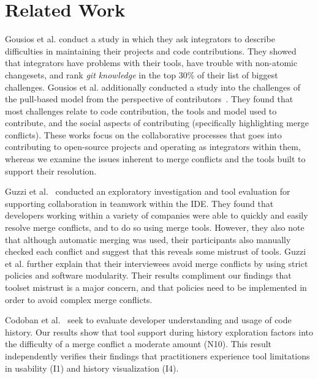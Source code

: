 \section{Related Work}\label{related_work}

Gousios et al. \cite{integrator_perspective} conduct a study in which they ask integrators to describe difficulties in maintaining their projects and code contributions. 
They showed that integrators have problems with their tools, have trouble with non-atomic changesets, and rank \textit{git knowledge} in the top 30\% of their list of biggest challenges. 
Gousios et al. additionally conducted a study into the challenges of the pull-based model from the perspective of contributors~\cite{gousios2016work}. 
They found that most challenges relate to code contribution, the tools and model used to contribute, and the social aspects of contributing (specifically highlighting merge conflicts).
These works focus on the collaborative processes that goes into contributing to open-source projects and operating as integrators within them, whereas we examine the issues inherent to merge conflicts and the tools built to support their resolution.

Guzzi et al.~\cite{Guzzi2015} conducted an exploratory investigation and tool evaluation for supporting collaboration in teamwork within the IDE.
They found that developers working within a variety of companies were able to quickly and easily resolve merge conflicts, and to do so using merge tools.
However, they also note that although automatic merging was used, their participants also manually checked each conflict and suggest that this reveals some mistrust of tools.
Guzzi et al. further explain that their interviewees avoid merge conflicts by using strict policies and software modularity.
Their results compliment our findings that toolset mistrust is a major concern, and that policies need to be implemented in order to avoid complex merge conflicts.

Codoban et al.~\cite{Mihai_lenses} seek to evaluate developer understanding and usage of code history. Our results show that tool support during history exploration factors into the difficulty of a merge conflict a moderate amount (N10). This result independently verifies their findings that practitioners experience tool limitations in usability (I1) and history visualization (I4).